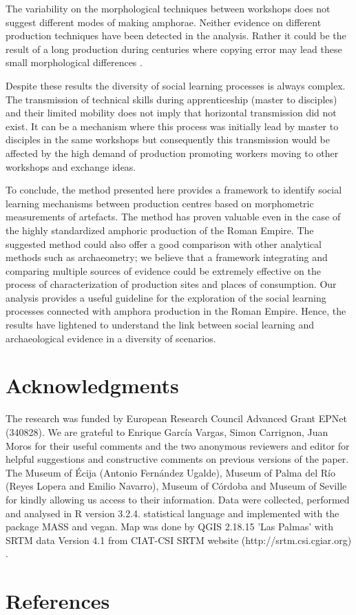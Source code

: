 \documentclass[review]{elsarticle}
\begin{document}
The variability on the morphological techniques between workshops does not suggest different modes of making amphorae. Neither evidence on different production techniques have been detected in the analysis. Rather it could be the result of a long production during centuries where copying error may lead these small morphological differences \citep{gandon_copying_2014}.

Despite these results the diversity of social learning processes is always complex. The transmission of technical skills during apprenticeship (master to disciples) and their limited mobility does not imply that horizontal transmission did not exist. It can be a mechanism where this process was initially lead by master to disciples in the same workshops but consequently this transmission would be affected by the high demand of production promoting workers moving to other workshops and exchange ideas. 

To conclude, the method presented here provides a framework to identify social learning mechanisms between production centres based on morphometric measurements of artefacts. The method has proven valuable even in the case of the highly standardized amphoric production of the Roman Empire. The suggested method could also offer a good comparison with other analytical methods such as archaeometry; we believe that a framework integrating and comparing multiple sources of evidence could be extremely effective on the process of characterization of production sites and places of consumption. Our analysis provides a useful guideline for the exploration of the social learning processes connected with amphora production in the Roman Empire. Hence, the results have lightened to understand the link between social learning and archaeological evidence in a diversity of scenarios. 
 

\section{Acknowledgments}

The research was funded by European Research Council Advanced Grant EPNet (340828). We are grateful to Enrique Garc\'ia Vargas, Simon Carrignon, Juan Moros for their useful comments and the two anonymous reviewers and editor for helpful suggestions and constructive comments on previous versions of the paper. The Museum of \'Ecija (Antonio Fern\'andez Ugalde), Museum of Palma del R\'io (Reyes Lopera and Emilio Navarro), Museum of C\'ordoba and Museum of Seville for kindly allowing us access to their information. Data were collected, performed and analysed in R version 3.2.4. statistical language and implemented with the package MASS and vegan. Map was done by QGIS 2.18.15 'Las Palmas' with SRTM data Version 4.1 from CIAT-CSI SRTM website (http://srtm.csi.cgiar.org) \citep{SRTM}. 


\section*{References}


\end{document}
